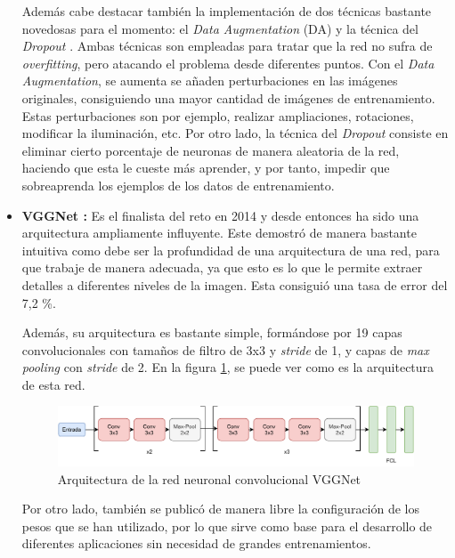 \begin{itemize}
    Además cabe destacar también la implementación de dos técnicas bastante novedosas para el momento: el \textit{Data Augmentation} (DA) y la técnica del \textit{Dropout} \cite{JMLR:v15:srivastava14a}. Ambas técnicas son empleadas para tratar que la red no sufra de \textit{overfitting}, pero atacando el problema desde diferentes puntos. Con el \textit{Data Augmentation}, se aumenta se añaden perturbaciones en las imágenes originales, consiguiendo una mayor cantidad de imágenes de entrenamiento. Estas perturbaciones son por ejemplo, realizar ampliaciones, rotaciones, modificar la iluminación, etc. Por otro lado, la técnica del \textit{Dropout} consiste en eliminar cierto porcentaje de neuronas de manera aleatoria de la red, haciendo que esta le cueste más aprender, y por tanto, impedir que sobreaprenda los ejemplos de los datos de entrenamiento.
    
    \item \textbf{VGGNet \cite{simonyan2015deep}:} Es el finalista del reto en 2014 y desde entonces ha sido una arquitectura ampliamente influyente. Este demostró de manera bastante intuitiva como debe ser la profundidad de una arquitectura de una red, para que trabaje de manera adecuada, ya que esto es lo que le permite extraer detalles a diferentes niveles de la imagen. Esta consiguió una tasa de error del 7,2 \%.
    
    Además, su arquitectura es bastante simple, formándose por 19 capas convolucionales con tamaños de filtro de 3x3 y \textit{stride} de 1, y capas de \textit{max pooling} con \textit{stride} de 2. En la figura \ref{fig:vggnet}, se puede ver como es la arquitectura de esta red.\\
    
    \begin{figure}[!h]
        \centering
        \includegraphics[width=1.05\textwidth]{figuras/desarrollo teorico/desarrollo_teorico-VGG16.pdf}
        \caption{Arquitectura de la red neuronal convolucional VGGNet}
        \label{fig:vggnet}
    \end{figure}
    
    Por otro lado, también se publicó de manera libre la configuración de los pesos que se han utilizado, por lo que sirve como base para el desarrollo de diferentes aplicaciones sin necesidad de grandes entrenamientos.
    

\end{itemize}

